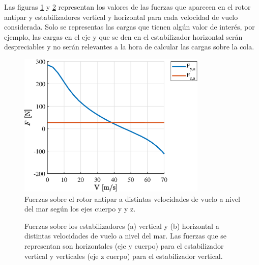 Las figuras \ref{FAP} y \ref{FE} representan los valores de las fuerzas que aparecen en el rotor antipar y estabilizadores vertical y horizontal para cada velocidad de vuelo considerada. Solo se representas las cargas que tienen algún valor de interés, por ejemplo, las cargas en el eje y que se den en el estabilizador horizontal serán despreciables y no serán relevantes a la hora de calcular las cargas sobre la cola.

\begin{figure}
	\centering
	\includegraphics[width=90mm]{graficos/FAP}
	\caption{Fuerzas sobre el rotor antipar a distintas velocidades de vuelo a nivel del mar según los ejes cuerpo y y z.}
	\label{FAP}
\end{figure}

\begin{figure}
	\centering
	\caption{Fuerzas sobre los estabilizadores (a) vertical y (b) horizontal a distintas velocidades de vuelo a nivel del mar. Las fuerzas que se representan son horizontales (eje y cuerpo) para el estabilizador vertical y verticales (eje z cuerpo) para el estabilizador vertical.}
	\label{FE}
\end{figure}


